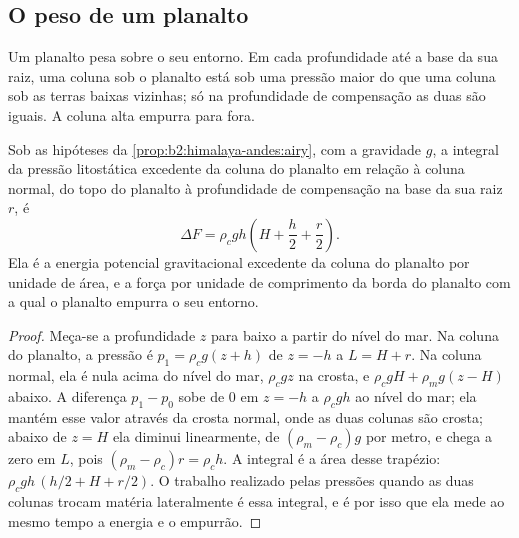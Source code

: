 \subsection{O peso de um planalto}

Um planalto pesa sobre o seu entorno. Em cada profundidade até a base da sua raiz, uma coluna
sob o planalto está sob uma pressão maior do que uma coluna sob as terras baixas vizinhas;
só na profundidade de compensação as duas são iguais. A coluna alta empurra para fora.

\begin{proposition}\label{prop:b2:himalaya-andes:gpe}
Sob as hipóteses da \cref{prop:b2:himalaya-andes:airy}, com a gravidade $g$, a integral da
pressão litostática excedente da coluna do planalto em relação à coluna normal, do topo
do planalto à profundidade de compensação na base da sua raiz $r$, é
\[
  \Delta F = \rho_c g h \left(H + \frac{h}{2} + \frac{r}{2}\right) .
\]
Ela é a energia potencial gravitacional excedente da coluna do planalto por unidade de área, e a
força por unidade de comprimento da borda do planalto com a qual o planalto empurra o seu
entorno.
\end{proposition}

\begin{proof}
Meça-se a profundidade $z$ para baixo a partir do nível do mar. Na coluna do planalto, a pressão é $p_1 =
\rho_c g (z + h)$ de $z = -h$ a $L = H + r$. Na coluna normal, ela é nula acima do nível do
mar, $\rho_c g z$ na crosta, e $\rho_c g H + \rho_m g (z - H)$ abaixo. A diferença $p_1
- p_0$ sobe de 0 em $z = -h$ a $\rho_c g h$ ao nível do mar; ela mantém esse valor através da
crosta normal, onde as duas colunas são crosta; abaixo de $z = H$ ela diminui linearmente, de
$(\rho_m - \rho_c) g$ por metro, e chega a zero em $L$, pois $(\rho_m - \rho_c) r = \rho_c
h$. A integral é a área desse trapézio: $\rho_c g h\,(h/2 + H + r/2)$. O trabalho realizado pelas
pressões quando as duas colunas trocam matéria lateralmente é essa integral, e é por isso que ela
mede ao mesmo tempo a energia e o empurrão.
\end{proof}

